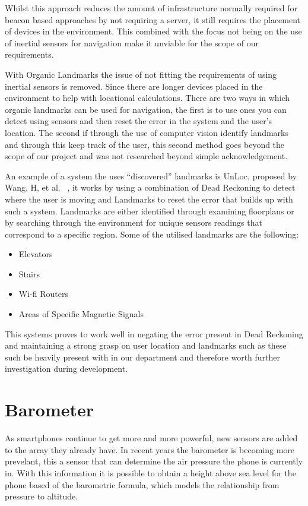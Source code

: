 \documentclass[main.tex]{subfiles}
\begin{document}
Whilst this approach reduces the amount of infrastructure normally required for beacon based approaches by not requiring a server, it still requires the placement of devices in the environment. This combined with the focus not being on the use of inertial sensors for navigation make it unviable for the scope of our requirements.

With Organic Landmarks the issue of not fitting the requirements of using inertial sensors is removed. Since there are longer devices placed in the environment to help with locational calculations. There are two ways in which organic landmarks can be used for navigation, the first is to use ones you can detect using sensors and then reset the error in the system and the user's location. The second if through the use of computer vision identify landmarks and through this keep track of the user, this second method goes beyond the scope of our project and was not researched beyond simple acknowledgement.

An example of a system the uses ``discovered'' landmarks is UnLoc, proposed by Wang. H, et al. ~\cite{wanf2012no}, it works by using a combination of Dead Reckoning to detect where the user is moving and Landmarks to reset the error that builds up with such a system. Landmarks are either identified through examining floorplans or by searching through the environment for unique sensors readings that correspond to a specific region. Some of the utilised landmarks are the following:

\begin{itemize}
	\item Elevators
	\item Stairs
	\item Wi-fi Routers
	\item Areas of Specific Magnetic Signals
\end{itemize}

This systems proves to work well in negating the error present in Dead Reckoning and maintaining a strong grasp on user location and landmarks such as these such be heavily present with in our department and therefore worth further investigation during development.

\section{Barometer}

As smartphones continue to get more and more powerful, new sensors are added to the array they already have. In recent years the barometer is becoming more prevelant, this a sensor that can determine the air pressure the phone is currently in. With this information it is possible to obtain a height above sea level for the phone based of the barometric formula, which models the relationship from pressure to altitude.
\end{document}
